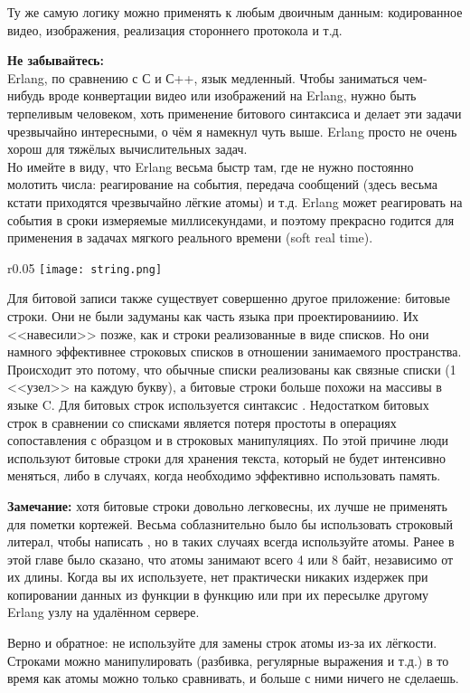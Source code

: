 Ту же самую логику можно применять к любым двоичным данным: кодированное видео, изображения, реализация стороннего протокола и т.д.\\ 
\colorbox{lorange}
{
    \begin{minipage}{\linewidth}
        \textbf{Не забывайтесь:}\\ 
        Erlang, по сравнению с С и С++, язык медленный.
        Чтобы заниматься чем\--нибудь вроде конвертации видео или изображений на Erlang, нужно быть терпеливым человеком, хоть применение битового синтаксиса и делает эти задачи чрезвычайно интересными, о чём я намекнул чуть выше.
        Erlang просто не очень хорош для тяжёлых вычислительных задач.\\ 
        Но имейте в виду, что Erlang весьма быстр там, где не нужно постоянно молотить числа: реагирование на события, передача сообщений (здесь весьма кстати приходятся чрезвычайно лёгкие атомы) и т.д.
        Erlang может реагировать на события в сроки измеряемые миллисекундами, и поэтому прекрасно годится для применения в задачах мягкого реального времени (soft real time).\\ 
    \end{minipage}
}

\begin{wrapfigure}{r}{0.05\textwidth}
    \texttt{[image: string.png]}
\end{wrapfigure}

Для битовой записи также существует совершенно другое приложение: битовые строки.
Они не были задуманы как часть языка при проектированиию.
Их <<навесили>> позже, как и строки реализованные в виде списков.
Но они намного эффективнее строковых списков в отношении занимаемого пространства.
Происходит это потому, что обычные списки реализованы как связные списки (1 <<узел>> на каждую букву), а битовые строки больше похожи на массивы в языке C.
Для битовых строк используется синтаксис .
Недостатком битовых строк в сравнении со списками является потеря простоты в операциях сопоставления с образцом и в строковых манипуляциях.
По этой причине люди используют битовые строки для хранения текста, который не будет интенсивно меняться, либо в случаях, когда необходимо эффективно использовать память.\\ 
\colorbox{lgray}{
    \begin{minipage}{\linewidth}
        \textbf{Замечание:} хотя битовые строки довольно легковесны, их лучше не применять для пометки кортежей.
        Весьма соблазнительно было бы использовать строковый литерал, чтобы написать , но в таких случаях всегда используйте атомы.
        Ранее в этой главе было сказано, что атомы занимают всего 4 или 8 байт, независимо от их длины.
        Когда вы их используете, нет практически никаких издержек при копировании данных из функции в функцию или при их пересылке другому Erlang узлу на удалённом сервере.
        
        Верно и обратное: не используйте для замены строк атомы из\--за их лёгкости.
        Строками можно манипулировать (разбивка, регулярные выражения и т.д.) в то время как атомы можно только сравнивать, и больше с ними ничего не сделаешь.
    \end{minipage}
}

